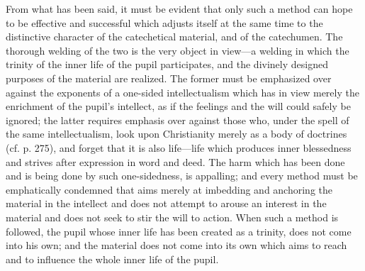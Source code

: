 From what has been said, it must be evident that only such a method can hope to be effective and successful which adjusts itself at the same time to the distinctive character of the catechetical material, and of the catechumen. The thorough welding of the two is the very object in view—a welding in which the trinity of the inner life of the pupil participates, and the divinely designed purposes of the material are realized. The former must be emphasized over against the exponents of a one-sided intellectualism which has in view merely the enrichment of the pupil’s intellect, as if the feelings and the will could safely be ignored; the latter requires emphasis over against those who, under the spell of the same intellectualism, look upon Christianity merely as a body of doctrines (cf. p. 275), and forget that it is also life—life which produces inner blessedness and strives after expression in word and deed. The harm which has been done and is being done by such one-sidedness, is appalling; and every method must be emphatically condemned that aims merely at imbedding and anchoring the material in the intellect and does not attempt to arouse an interest in the material and does not seek to stir the will to action. When such a method is followed, the pupil whose inner life has been created as a trinity, does not come into his own; and the material does not come into its own which aims to reach and to influence the whole inner life of the pupil.

